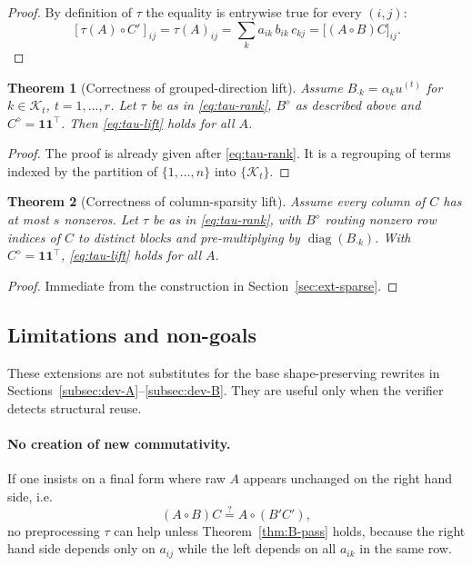 \documentclass[11pt,a4paper]{article}
\newtheorem{theorem}{Theorem}[section]
\theoremstyle{definition}
\newcommand{\Had}{\circ}
\newcommand{\diag}{\operatorname{diag}}
\begin{document}
\begin{proof}
By definition of $\tau$ the equality is entrywise true for every $(i,j)$:
\[
[\tau(A)\Had C']_{i j} = \tau(A)_{i j} = \sum_k a_{i k}\, b_{i k}\, c_{k j} = \big[(A \Had B) C\big]_{i j}.
\]
\end{proof}

\begin{theorem}[Correctness of grouped-direction lift]\label{thm:tau2}
Assume $B_{\cdot k}=\alpha_k u^{(t)}$ for $k\in\mathcal{K}_t$, $t=1,\dots,r$. Let $\tau$ be as in \eqref{eq:tau-rank}, $B^\diamond$ as described above and $C^\diamond=\bm{1}\bm{1}^\top$. Then \eqref{eq:tau-lift} holds for all $A$.
\end{theorem}

\begin{proof}
The proof is already given after \eqref{eq:tau-rank}. It is a regrouping of terms indexed by the partition of $\{1,\dots,n\}$ into $\{\mathcal{K}_t\}$.
\end{proof}

\begin{theorem}[Correctness of column-sparsity lift]\label{thm:tau3}
Assume every column of $C$ has at most $s$ nonzeros. Let $\tau$ be as in \eqref{eq:tau-rank}, with $B^\diamond$ routing nonzero row indices of $C$ to distinct blocks and pre-multiplying by $\diag(B_{\cdot k})$. With $C^\diamond=\bm{1}\bm{1}^\top$, \eqref{eq:tau-lift} holds for all $A$.
\end{theorem}

\begin{proof}
Immediate from the construction in Section~\ref{sec:ext-sparse}.
\end{proof}

\subsection{Limitations and non-goals}
These extensions are not substitutes for the base shape-preserving rewrites in Sections~\ref{subsec:dev-A}–\ref{subsec:dev-B}. They are useful only when the verifier detects structural reuse.

\paragraph{No creation of new commutativity.}
If one insists on a final form where raw $A$ appears unchanged on the right hand side, i.e.
\[
(A \Had B) C \stackrel{?}{=} A \Had (B' C'),
\]
no preprocessing $\tau$ can help unless Theorem~\ref{thm:B-pass} holds, because the right hand side depends only on $a_{i j}$ while the left depends on all $a_{i k}$ in the same row.
\end{document}

